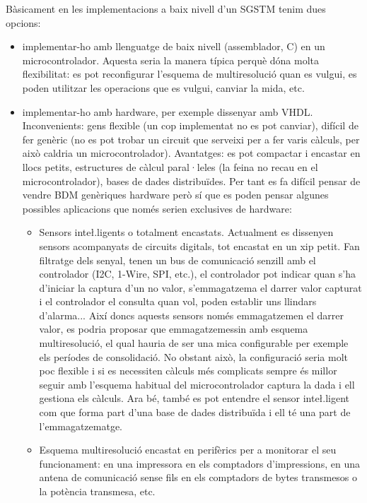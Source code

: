 Bàsicament en les implementacions a baix nivell d'un SGSTM tenim dues opcions:

\begin{itemize}
\item implementar-ho amb llenguatge de baix nivell (assemblador, C) en un microcontrolador. Aquesta seria la manera típica perquè dóna molta flexibilitat: es pot reconfigurar l'esquema de multiresolució quan es vulgui, es poden utilitzar les operacions que es vulgui, canviar la mida, etc. 

\item implementar-ho amb hardware, per exemple dissenyar amb
  VHDL. Inconvenients: gens flexible (un cop implementat no es pot
  canviar), difícil de fer genèric (no es pot trobar un circuit que
  serveixi per a fer varis càlculs, per això caldria un
  microcontrolador). Avantatges: es pot compactar i encastar en
  llocs petits, estructures de càlcul paral·leles (la feina no recau
  en el microcontrolador), bases de dades distribuïdes. Per tant es fa
  difícil pensar de vendre BDM genèriques hardware però sí que es
  poden pensar algunes possibles aplicacions que només serien
  exclusives de hardware:

  \begin{itemize}
  \item Sensors inte\l.ligents o totalment encastats. Actualment es
    dissenyen sensors acompanyats de circuits digitals, tot encastat
    en un xip petit. Fan filtratge dels senyal, tenen un bus de
    comunicació senzill amb el controlador (I2C, 1-Wire, SPI, etc.), el
    controlador pot indicar quan s'ha d'iniciar la captura d'un no
    valor, s'emmagatzema el darrer valor capturat i el controlador el
    consulta quan vol, poden establir uns llindars d'alarma... Així
    doncs aquests sensors només emmagatzemen el darrer valor, es
    podria proposar que emmagatzemessin amb esquema multiresolució, el
    qual hauria de ser una mica configurable per exemple els períodes
    de consolidació. No obstant això, la configuració seria molt poc
    flexible i si es necessiten càlculs més complicats sempre és
    millor seguir amb l'esquema habitual del microcontrolador captura
    la dada i ell gestiona els càlculs. Ara bé, també es pot entendre
    el sensor inte\l.ligent com que forma part d'una base de dades
    distribuïda i ell té una part de l'emmagatzematge.
    
  \item Esquema multiresolució encastat en perifèrics per a monitorar
    el seu funcionament: en una impressora en els comptadors
    d'impressions, en una antena de comunicació sense fils en els
    comptadors de bytes transmesos o la potència transmesa, etc.


\end{itemize}
\end{itemize}
